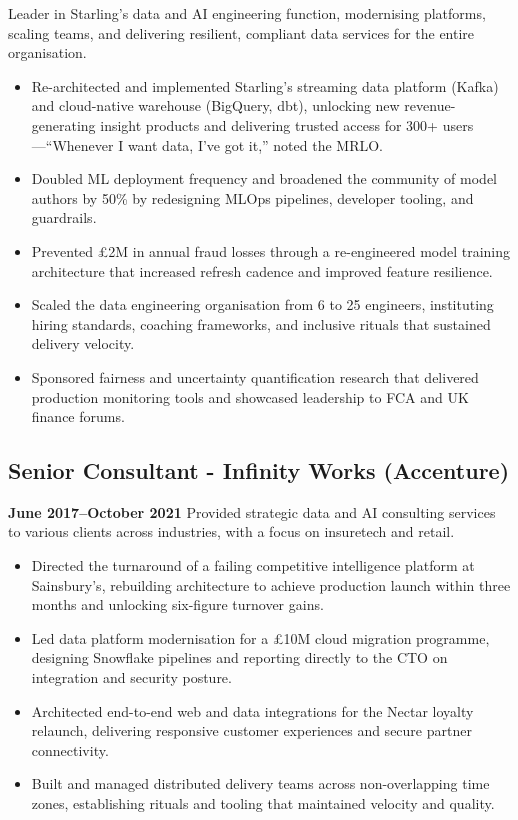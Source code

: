 \documentclass[a4paper]{scrartcl}
\begin{document}
Leader in Starling's data and AI engineering function, modernising platforms, scaling teams, and delivering resilient, compliant data services for the entire organisation.
\begin{itemize}
	\item Re-architected and implemented Starling's streaming data platform (Kafka) and cloud-native warehouse (BigQuery, dbt), unlocking new revenue-generating insight products and delivering trusted access for 300+ users—``Whenever I want data, I've got it,'' noted the MRLO.
	\item Doubled ML deployment frequency and broadened the community of model authors by 50\% by redesigning MLOps pipelines, developer tooling, and guardrails.
	\item Prevented £2M in annual fraud losses through a re-engineered model training architecture that increased refresh cadence and improved feature resilience.
	\item Scaled the data engineering organisation from 6 to 25 engineers, instituting hiring standards, coaching frameworks, and inclusive rituals that sustained delivery velocity.
	\item Sponsored fairness and uncertainty quantification research that delivered production monitoring tools and showcased leadership to FCA and UK finance forums.
\end{itemize}

\subsection*{Senior Consultant - Infinity Works (Accenture)}
\textbf{June 2017--October 2021}
Provided strategic data and AI consulting services to various clients across industries, with a focus on insuretech and retail.
\begin{itemize}
	\item Directed the turnaround of a failing competitive intelligence platform at Sainsbury's, rebuilding architecture to achieve production launch within three months and unlocking six-figure turnover gains.
	\item Led data platform modernisation for a £10M cloud migration programme, designing Snowflake pipelines and reporting directly to the CTO on integration and security posture.
	\item Architected end-to-end web and data integrations for the Nectar loyalty relaunch, delivering responsive customer experiences and secure partner connectivity.
	\item Built and managed distributed delivery teams across non-overlapping time zones, establishing rituals and tooling that maintained velocity and quality.
\end{itemize}
\end{document}
